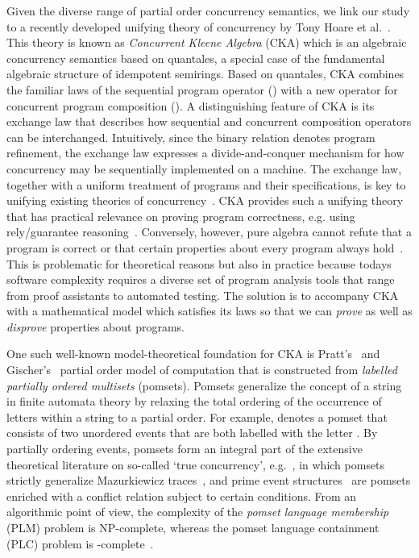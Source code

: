 \documentclass{llncs}
\begin{document}
Given the diverse range of partial order concurrency semantics, we link our study to a recently developed unifying theory of concurrency by Tony Hoare et al.~\cite{HMSW2011}. This theory is known as \emph{Concurrent Kleene Algebra} (CKA) which is an algebraic concurrency semantics based on quantales, a special case of the fundamental algebraic structure of idempotent semirings. Based on quantales, CKA combines the familiar laws of the sequential program operator () with a new operator for concurrent program composition (). A distinguishing feature of CKA is its exchange law  that describes how sequential and concurrent composition operators can be interchanged. Intuitively, since the binary relation  denotes program refinement, the exchange law expresses a divide-and-conquer mechanism for how concurrency may be sequentially implemented on a machine. The exchange law, together with a uniform treatment of programs and their specifications, is key to unifying existing theories of concurrency~\cite{HvS2014}. CKA provides such a unifying theory~\cite{HvS2012,HvS2014} that has practical relevance on proving program correctness, e.g. using rely/guarantee reasoning~\cite{HMSW2011}. Conversely, however, pure algebra cannot refute that a program is correct or that certain properties about every program always hold~\cite{HvS2012,HvS2014,HvSMSVZOH2014}. This is problematic for theoretical reasons but also in practice because todays software complexity requires a diverse set of program analysis tools that range from proof assistants to automated testing. The solution is to accompany CKA with a mathematical model which satisfies its laws so that we can \emph{prove} as well as \emph{disprove} properties about programs.

One such well-known model-theoretical foundation for CKA is Pratt's~\cite{P1986} and Gischer's~\cite{G1988} partial order model of computation that is constructed from \emph{labelled partially ordered multisets} (pomsets). Pomsets generalize the concept of a string in finite automata theory by relaxing the total ordering of the occurrence of letters within a string to a partial order. For example,  denotes a pomset that consists of two unordered events that are both labelled with the letter . By partially ordering events, pomsets form an integral part of the extensive theoretical literature on so-called `true concurrency', e.g.~\cite{P1966,L1978,G1981,NPW1981,P1986,G1988}, in which pomsets strictly generalize Mazurkiewicz traces~\cite{BK1992}, and prime event structures~\cite{NPW1981} are pomsets enriched with a conflict relation subject to certain conditions. From an algorithmic point of view, the complexity of the \emph{pomset language membership} (PLM) problem is NP-complete, whereas the pomset language containment (PLC) problem is -complete~\cite{FKL1993}.
\end{document}
